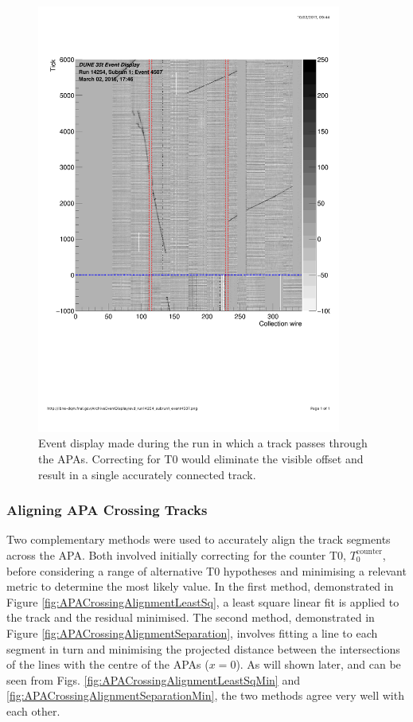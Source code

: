 \begin{figure}[ht]
  \centering
  \includegraphics[width=10cm]{evd_t0_2.pdf}
  \caption[Event display showing the effect of unaccounting for T0]{Event display made during the run in which a track passes through the APAs.  Correcting for T0 would eliminate the visible offset and result in a single accurately connected track.}
  \label{fig:evd_t0}
\end{figure}

\subsubsection{Aligning APA Crossing Tracks}\label{sec:APACrossingAlignment}

Two complementary methods were used to accurately align the track segments across the APA.  Both involved initially correcting for the counter T0, $T_0^{\mathrm{counter}}$, before considering a range of alternative T0 hypotheses and minimising a relevant metric to determine the most likely value.  In the first method, demonstrated in Figure \ref{fig:APACrossingAlignmentLeastSq}, a least square linear fit is applied to the track and the residual minimised.  The second method, demonstrated in Figure \ref{fig:APACrossingAlignmentSeparation}, involves fitting a line to each segment in turn and minimising the projected distance between the intersections of the lines with the centre of the APAs ($x=0$).  As will shown later, and can be seen from Figs. \ref{fig:APACrossingAlignmentLeastSqMin} and \ref{fig:APACrossingAlignmentSeparationMin}, the two methods agree very well with each other.

